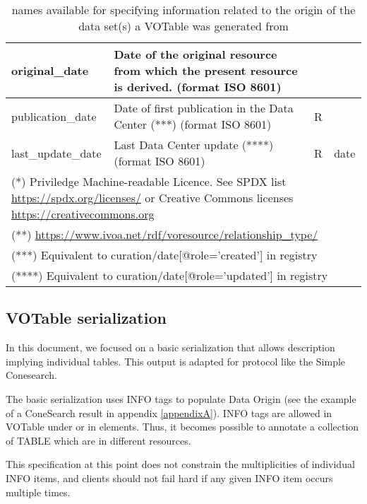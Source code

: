 \documentclass[11pt,a4paper]{ivoa}
\begin{document}
\begin{table}
\begin{tabular}{|l|p{5cm}|l|l|}
%
original\_date     & Date of the original resource from which the present resource is derived. (format ISO 8601) &    &  \\ \hline
publication\_date  & Date of first publication in the Data Center (***) (format ISO 8601) &  R &  \\ \hline
last\_update\_date & Last Data Center update (****) (format ISO 8601) & R & date\\ \hline
\multicolumn{4}{p{\textwidth}}{\footnotesize(*) Priviledge Machine-readable Licence.
See SPDX list \url{https://spdx.org/licenses/} or Creative Commons licenses \url{https://creativecommons.org}}\\
\multicolumn{4}{p{\textwidth}}{\footnotesize(**) \url{https://www.ivoa.net/rdf/voresource/relationship\_type/}}\\
\multicolumn{4}{p{\textwidth}}{\footnotesize(***) Equivalent to curation/date[@role='created'] in registry}\\
\multicolumn{4}{p{\textwidth}}{\footnotesize(****) Equivalent to curation/date[@role='updated'] in registry}
\end{tabular}
\caption{ names available for specifying information
related to the origin of the data set(s) a VOTable was generated from}
\label{tab:origin-names}
\end{table}


\subsection{VOTable serialization}

In this document, we focused on a basic serialization that allows description implying individual tables.
This output is adapted for protocol like the Simple Conesearch.

The basic serialization uses INFO tags to populate Data Origin (see the example of a ConeSearch result in appendix  \ref{appendixA}).
INFO tags are allowed in VOTable under  or in  elements.
Thus, it becomes possible to annotate a collection of TABLE which are in different resources.

This specification at this point does not constrain the multiplicities of individual INFO items, and clients should not fail hard if any given INFO item occurs multiple times.
\end{document}
